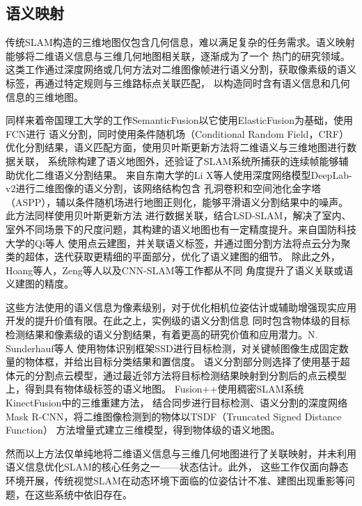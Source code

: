 \subsection{语义映射}
传统SLAM构造的三维地图仅包含几何信息，难以满足复杂的任务需求。语义映射能够将二维语义信息与三维几何地图相关联，逐渐成为了一个
热门的研究领域。这类工作通过深度网络或几何方法对二维图像帧进行语义分割，获取像素级的语义标签，再通过特定规则与三维路标点关联匹配，
以构造同时含有语义信息和几何信息的三维地图。

同样来着帝国理工大学的工作SemanticFusion\citep{MccormacSemanticFusion}以它使用ElasticFusion为基础，使用FCN\citep{long2015fully}进行
语义分割，同时使用条件随机场（Conditional Random Field，CRF）优化分割结果，语义匹配方面，使用贝叶斯更新方法将二维语义与三维地图进行数据关联，
系统除构建了语义地图外，还验证了SLAM系统所捕获的连续帧能够辅助优化二维语义分割结果。
来自东南大学的Li X等人\citep{LiSemi}使用深度网络模型DeepLab-v2\citep{Chen2014Semantic}进行二维图像的语义分割，该网络结构包含
孔洞卷积和空间池化金字塔（ASPP），辅以条件随机场进行地图正则化，能够平滑语义分割结果中的噪声。此方法同样使用贝叶斯更新方法
进行数据关联，结合LSD-SLAM，解决了室内、室外不同场景下的尺度问题，其构建的语义地图也有一定精度提升。来自国防科技大学的Qi等人\citep{qi2018deep}
使用点云建图，并关联语义标签，并通过图分割方法将点云分为聚类的超体，迭代获取更精细的平面部分，优化了语义建图的细节。
除此之外，Hoang等人\citep{hoang2019high}，Zeng等人\citep{zeng2018semantic}以及CNN-SLAM\citep{tateno2017cnn}等工作都从不同
角度提升了语义关联或语义建图的精度。

这些方法使用的语义信息为像素级别，对于优化相机位姿估计或辅助增强现实应用开发的提升价值有限。在此之上，实例级的语义分割信息
同时包含物体级的目标检测结果和像素级的语义分割结果，有着更高的研究价值和应用潜力。N. Sunderhauf等人\citep{S2017Meaningful}
使用物体识别框架SSD\citep{Liu2016SSD}进行目标检测，对关键帧图像生成固定数量的物体框，并给出目标分类结果和置信度。
语义分割部分则选择了使用基于超体元的分割点云模型，通过最近邻方法将目标检测结果映射到分割后的点云模型上，得到具有物体级标签的语义地图。
Fusion++\citep{mccormac2018fusion++}使用稠密SLAM系统KinectFusion\citep{Newcombe2011KinectFusion}中的三维重建方法，
结合同步进行目标检测、语义分割的深度网络Mask R-CNN\citep{HeMask}，将二维图像检测到的物体以TSDF（Truncated Signed Distance Function）
方法增量式建立三维模型，得到物体级的语义地图。

然而以上方法仅单纯地将二维语义信息与三维几何地图进行了关联映射，并未利用语义信息优化SLAM的核心任务之一——状态估计。此外，
这些工作仅面向静态环境开展，传统视觉SLAM在动态环境下面临的位姿估计不准、建图出现重影等问题，在这些系统中依旧存在。


